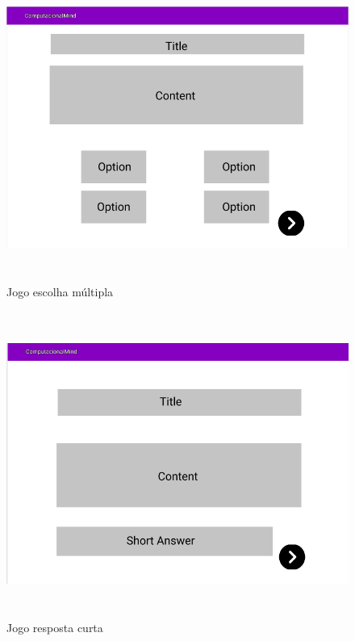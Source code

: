 \documentclass[11pt,a4paper]{report}
\begin{document}
\begin{figure}[H]
\centering
\includegraphics[width = 14cm,height = 10cm]{MockUserGameMC.png}
\caption{Jogo escolha múltipla}
\label{fig:MockUserGameMC}
\end{figure}

\begin{figure}[H]
\centering
\includegraphics[width = 14cm,height = 10cm]{MockUserGameSA.png}
\caption{Jogo resposta curta}
\label{fig:MockUserGameSA}
\end{figure}
\end{document}
